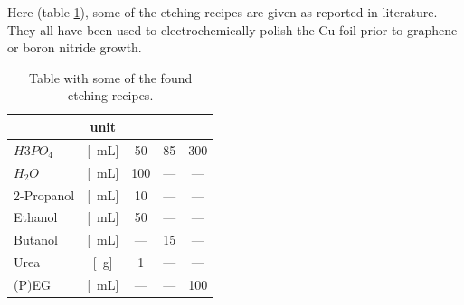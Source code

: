 Here (table \ref{tab:etching-recipes}), some of the etching recipes are given as reported in literature. They all have been used to electrochemically polish the Cu foil prior to graphene or boron nitride growth.

\begin{table}[h] \centering
\caption{Table with some of the found etching recipes.}
 \begin{tabular}{lcccc}
	& unit & \cite{bin_zhang_low-temperature_2012} & \cite{stables_report_2008} & \cite{luo_effect_2011} \\ \hline \hline
$H3PO_4$	&[\SI{}{\milli\liter}]	& 50	& 85	& 300 \\
$H_2O$		&[\SI{}{\milli\liter}]	& 100	& ---	& --- \\
2-Propanol	&[\SI{}{\milli\liter}]	& 10	& ---	& --- \\
Ethanol		&[\SI{}{\milli\liter}]	& 50	& ---	& --- \\
Butanol		&[\SI{}{\milli\liter}]	& ---	& 15	& --- \\
Urea		&[\SI{}{\gram}]		& 1	& ---	& --- \\
(P)EG		&[\SI{}{\milli\liter}] 	& ---	& ---	& 100 \\
  \end{tabular}
\label{tab:etching-recipes}
\end{table}

